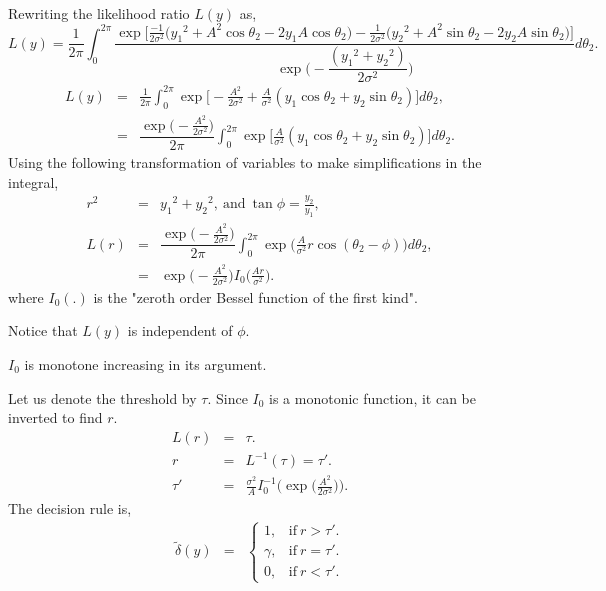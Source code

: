 \documentclass[a4paper,english,12pt]{article}
\begin{document}
\begin{exmp}
\begin{eqnarray}
\end{eqnarray}	
Rewriting the likelihood ratio $L(y)$ as,
\begin{equation*}
L(y) = \frac{1}{2\pi}\int_{0}^{2\pi}\dfrac{\exp\Big[\frac{-1}{2{\sigma}^2}\Big({y_1}^2 + A^2{\cos\theta_2}-2y_1A\cos\theta_2\Big)-\frac{1}{2{\sigma}^2}\Big({y_2}^2 + A^2{\sin\theta_2}-2y_2A\sin\theta_2\Big)\Big]}{\exp\Big(-\dfrac{({y_1}^2 + {y_2}^2)}{2{\sigma}^2}\Big)}d\theta_2.
\end{equation*}
\begin{eqnarray}
L(y) &=& \frac{1}{2\pi}\int_{0}^{2\pi}\exp\Big[-\frac{A^2}{2{\sigma}^2}+\frac{A}{{\sigma}^2}(y_1\cos\theta_2 + y_2\sin\theta_2)\Big]d\theta_2, \nonumber \\
&=&\dfrac{\exp\big(-\frac{A^2}{2{\sigma}^2}\big)}{2\pi}\int_{0}^{2\pi}\exp\Big[\frac{A}{{\sigma}^2}(y_1\cos\theta_2 + y_2\sin\theta_2)\Big]d\theta_2.
\end{eqnarray}
Using the following transformation of variables to make simplifications in the integral,
\begin{eqnarray}
r^2 &=& {y_1}^2 + {y_2}^2,~\mbox{and}~\tan\phi =\frac{y_2}{y_1},\\\nonumber
L(r) &=& \dfrac{\exp\big(-\frac{A^2}{2\sigma^2}\big)}{2\pi}\int_{0}^{2\pi}\exp\big(\frac{A}{\sigma^2}r\cos(\theta_2 - \phi)\big)d\theta_2,\\
&=& \exp\big(-\frac{A^2}{2\sigma^2}\big)I_0\big(\frac{Ar}{\sigma^2}\big).
\end{eqnarray}
where $I_0(.)$ is the "zeroth order Bessel function of the first kind".
\begin{note} 
Notice that $L(y)$ is independent of $\phi$.
\end{note}
\begin{note}
$I_0$ is monotone increasing in its argument.
\end{note}
Let us denote the threshold by $\tau$. Since $I_0$ is a monotonic function, it can be inverted to find $r$.
\begin{eqnarray}
\nonumber
L(r) &=& \tau.\\\nonumber
r &=& L^{-1}(\tau) = \tau'.\\
\tau' &=& \frac{\sigma^2}{A}I_0^{-1}\Big(\exp\big(\frac{A^2}{2\sigma^2}\big)\Big).
\end{eqnarray}
The decision rule is,
\begin{eqnarray}
\tilde{\delta}(y) &=&
\begin{cases}
1, &\mbox{if}~ r > \tau'.\\
\gamma, &\mbox{if}~ r = \tau'.\\
0, &\mbox{if}~ r < \tau'.
\end{cases}
\end{eqnarray}
\end{exmp}
\end{document}
